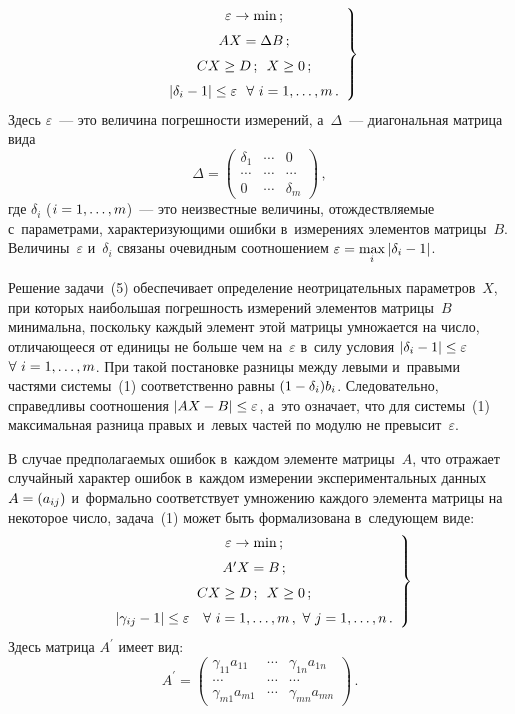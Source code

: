 \begin{multicols}{2}
\noindent
  \begin{equation}
  \left.
  \begin{array}{c}
  \varepsilon\to \min\,;\\[6pt]
  AX=\Delta B\,;\\[6pt]
  CX\geq D\,;\enskip
  X\geq 0\,;\\[6pt]
  \left\vert \delta_i-1\right\vert \leq \varepsilon\ \ \forall\ i=1,\ldots ,m\,.
  \end{array}
  \right\}
  \label{e5-spi}
  \end{equation}
  Здесь $\varepsilon$~--- это величина погрешности измерений, а~$\Delta$~---
диагональная матрица вида
  $$
  \Delta = \begin{pmatrix}
  \delta_1 & \cdots & 0\\
  \cdots & \cdots &\cdots\\
  0 &\cdots & \delta_m
  \end{pmatrix}\,,
  $$
где $\delta_i$ ($i\hm=1,\ldots ,m$)~--- это неизвестные величины,
отождествляемые с~параметрами, характеризующими ошибки в~измерениях
элементов матрицы~$B$. Величины~$\varepsilon$ и~$\delta_i$ связаны
очевидным соотношением $\varepsilon\hm= \max\limits_i \left\vert \delta_i\hm-
1\right\vert$.

  Решение задачи~(5) обеспечивает определение неотрицательных
параметров~$X$, при которых наибольшая погрешность измерений элементов
матрицы~$B$ минимальна, поскольку каждый элемент этой матрицы
умножается на число, отличающееся от единицы не больше чем
на~$\varepsilon$ в~силу условия $\left\vert \delta_i\hm- 1\right\vert \hm \leq
\varepsilon$ $\forall\ i\hm= 1,\ldots , m$. При такой постановке разницы между
левыми и~правыми частями системы~(1) соответственно равны $(1\hm-
\delta_i)b_i$. Следовательно, справедливы соотношения $\vert AX\hm- B\vert
\hm\leq \varepsilon$, а~это означает, что для системы~(1) максимальная разница
правых и~левых частей по модулю не превысит~$\varepsilon$.

  В случае предполагаемых ошибок в~каждом элементе матрицы~$A$, что
отражает случайный характер ошибок в~каждом измерении экспериментальных
данных $A\hm= (a_{ij})$ и~формально соответствует умножению каждого
элемента матрицы на некоторое число, задача~(1) может быть формализована
в~сле\-ду\-ющем виде:
  \begin{equation}
  \left.
  \begin{array}{c}
  \varepsilon\to \min\,;\\[6pt]
  A^\prime X=B\,;\\[6pt]
  CX\geq D\,;\enskip
  X\geq 0\,;\\[6pt]
  \left\vert \gamma_{ij}-1\right\vert \leq \varepsilon\ \ \ \forall\ i=1,\ldots, m\,,\
\forall\ j=1,\ldots ,n\,.
  \end{array}
  \right\}
  \label{e6-spi}
  \end{equation}
  Здесь матрица $A^\prime$ имеет вид:
  $$
  A^\prime = \begin{pmatrix}
  \gamma_{11} a_{11} &\cdots & \gamma_{1n}a_{1n}\\
  \cdots &\cdots &\cdots\\
  \gamma_{m1}a_{m1} &\cdots & \gamma_{mn} a_{mn}
  \end{pmatrix}\,.
  $$


\end{multicols}
